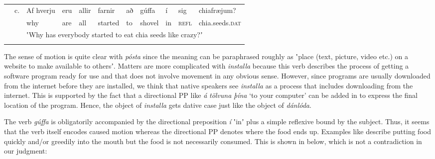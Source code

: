 \tabletail{}
\tablelasttail{}
\begin{tabularx}{\textwidth}{XXXXXXXXXXX} & c. & Af hverju & eru & allir & farnir & að & gúffa & í & sig & chiafræjum?\\
\lsptoprule
&  & why & are & all & started & to & shovel & in & \textsc{refl} & chia.seeds.\textsc{dat}\\
&  & \multicolumn{9}{X}{ʽWhy has everybody started to eat chia seeds like crazy?ʼ}\\
\lspbottomrule
\end{tabularx}
The sense of motion is quite clear with \textit{pósta} since the meaning can be paraphrased roughly as ʽplace (text, picture, video etc.) on a website to make available to othersʼ. Matters are more complicated with \textit{installa} because this verb describes the process of getting a software program ready for use and that does not involve movement in any obvious sense. However, since programs are usually downloaded from the internet before they are installed, we think that native speakers see \textit{installa} as a process that includes downloading from the internet. This is supported by the fact that a directional PP like \textit{á} \textit{tölvuna} \textit{þína} ‘to your computer’ can be added in  to express the final location of the program. Hence, the object of \textit{installa} gets dative case just like the object of \textit{dánlóda}. 

The verb \textit{gúffa} is obligatorily accompanied by the directional preposition \textit{í} ʽinʼ plus a simple reflexive bound by the subject. Thus, it seems that the verb itself encodes caused motion whereas the directional PP denotes where the food ends up. Examples like  describe putting food quickly and/or greedily into the mouth but the food is not necessarily consumed. This is shown in  below, which is not a contradiction in our judgment: 

\tablefirsthead{}


